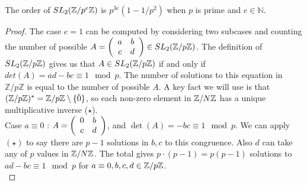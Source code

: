 \begin{lemma}\label{lem:orderofslznzpe}
The order of $\sltznz[p^e] $ is $p^{3e}( 1- 1/p^2)$ when $p$ is prime and $e \in \mathbb{N}$. 
\end{lemma}
\begin{proof}
 The case $e=1$ can be computed by considering two subcases and counting the number of possible $A =  \left(\begin{array}{ c c }  a& b \\ c & d \end{array} \right) \in \sltznz[p] $. The definition of $\sltznz[p]  $ gives us that $A \in \sltznz[p]  $ if and only if $ det(A) = ad -bc \equiv 1 \mod p$. The number of solutions to this equation in $\mathbb{Z}/p\mathbb{Z}$ is equal to the number of possible $A$. A key fact we will use is that $(\mathbb{Z}/p\mathbb{Z})^* = \znz[p] \setminus \{\bar{0}\}$, so each non-zero element in $\znz$ has a unique multiplicative inverse ($\star$).\\
 
    Case $a\equiv0$ : $A =  \left(\begin{array}{ c c }  0 & b \\ c & d \end{array} \right)$, and $\det(A) = -bc \equiv 1\mod p$. We can apply $(\star)$ to say there are $p-1$ solutions in $b,c$ to this congruence. Also $d$ can take any of $p$ values in $\znz$. The total gives $p\cdot(p-1) = p(p-1)$ solutions to $ad -bc \equiv 1 \mod p$ for $a \equiv 0,b,c,d  \in \znz[p]$. \\
    

\end{proof}
